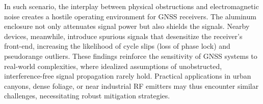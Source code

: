         \noindent
        In such scenario, the interplay between physical obstructions and electromagnetic noise creates a hostile operating environment for GNSS receivers. The aluminum enclosure not only attenuates signal power but also shields the signals. Nearby devices, meanwhile, introduce spurious signals that desensitize the receiver's front-end, increasing the likelihood of cycle slips (loss of phase lock) and pseudorange outliers. These findings reinforce the sensitivity of GNSS systems to real-world complexities, where idealized assumptions of unobstructed, interference-free signal propagation rarely hold. Practical applications in urban canyons, dense foliage, or near industrial RF emitters may thus encounter similar challenges, necessitating robust mitigation strategies.
